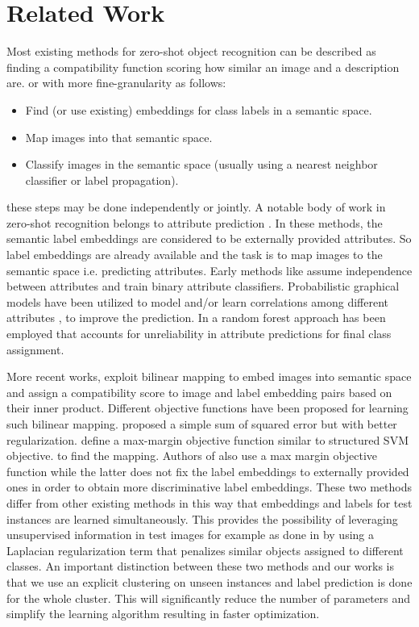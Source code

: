 \documentclass[wcp]{jmlr}
\begin{document}
\section{Related Work}
Most existing methods for zero-shot object recognition can be described as finding a compatibility function scoring how
similar an image and a description are.
or with more fine-granularity as follows:
\begin{itemize}
  \item Find (or use existing) embeddings for class labels in a semantic space.
  \item Map images into that semantic space.
  \item Classify images in the semantic space (usually using a nearest neighbor classifier or label propagation).
\end{itemize}
these steps may be done independently or jointly.
A notable body of work in zero-shot recognition belongs to attribute prediction  \cite{lampert09, topicmodel, ajoint11, unified13, suzuki14}.
In these methods, the semantic label embeddings are considered to be externally provided attributes. So label embeddings are
already available and the task is to map images to the semantic space i.e. predicting attributes.
Early methods like \cite{lampert09} assume independence between attributes and train binary attribute classifiers.
Probabilistic graphical models have been utilized to model and/or learn correlations among different attributes \cite{topicmodel, unified13}, to improve the prediction.
In \cite{jayaraman14}  a random forest approach has been employed that accounts for unreliability in attribute predictions
 for final class assignment.


More recent works, exploit bilinear mapping to embed images into semantic space and assign a compatibility score to image and label embedding
 pairs based on their inner product. Different objective functions have been proposed for learning such bilinear mapping. \cite{emb15}
 proposed a simple sum of squared error but with better regularization.
\cite{li15max} define a max-margin objective function similar to structured SVM objective.
 to find the mapping. Authors of \cite{li15max, semi15} also use a max margin objective function
while the latter does not fix the label embeddings to externally provided ones in order to obtain more discriminative label embeddings. These two methods
differ from other existing methods in this way that embeddings and labels for test instances are learned simultaneously. This provides the possibility of
leveraging unsupervised information in test images for example as done in \cite{semi15} by using a Laplacian regularization term that penalizes
 similar objects assigned to different classes.
 An important distinction between these two methods and our works is that we use an explicit clustering on unseen instances
 and label prediction is done for the whole cluster. This will significantly reduce the number of parameters
 and simplify the learning algorithm resulting in faster optimization.
\end{document}
